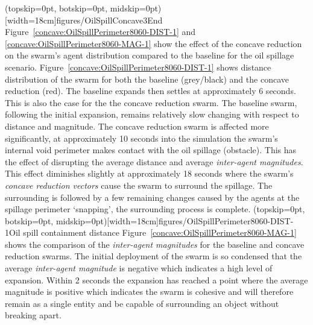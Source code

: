 \documentclass{ieeeaccess}
\begin{document}
\Figure[t!](topskip=0pt, botskip=0pt, midskip=0pt)[width=18cm]{figures/OilSpillConcave3}{End\label{concave:OilSpillConcave3}}
Figure~\ref{concave:OilSpillPerimeter8060-DIST-1} and \ref{concave:OilSpillPerimeter8060-MAG-1} show the effect of the concave reduction on the swarm's agent distribution compared to the baseline for the oil spillage scenario. 
Figure~\ref{concave:OilSpillPerimeter8060-DIST-1} shows distance distribution of the swarm for both the baseline (grey/black) and the concave reduction (red). The baseline expands then settles at approximately 6 seconds. This is also the case for the the concave reduction swarm. The baseline swarm, following the initial expansion, remains relatively slow changing with respect to distance and magnitude. The concave reduction swarm is affected more significantly, at approximately 10 seconds into the simulation the swarm's internal void perimeter makes contact with the oil spillage (obstacle). This has the effect of disrupting the average distance and average \textit{inter-agent magnitudes}. This effect diminishes slightly at approximately 18 seconds where the swarm's \textit{concave reduction vectors} cause the swarm to surround the spillage. The surrounding is followed by a few remaining changes caused by the agents at the spillage perimeter `snapping', the surrounding process is complete.
\Figure[t!](topskip=0pt, botskip=0pt, midskip=0pt)[width=18cm]{figures/OilSpillPerimeter8060-DIST-1}{Oil spill containment distance\label{concave:OilSpillPerimeter8060-DIST-1}}
Figure~\ref{concave:OilSpillPerimeter8060-MAG-1} shows the comparison of the \textit{inter-agent magnitudes} for the baseline and concave reduction swarms. The initial deployment of the swarm is so condensed that the average \textit{inter-agent magnitude} is negative which indicates a high level of expansion. Within 2 seconds the expansion has reached a point where the average magnitude is positive which indicates the swarm is cohesive and will therefore remain as a single entity and be capable of surrounding an object without breaking apart.
\end{document}
